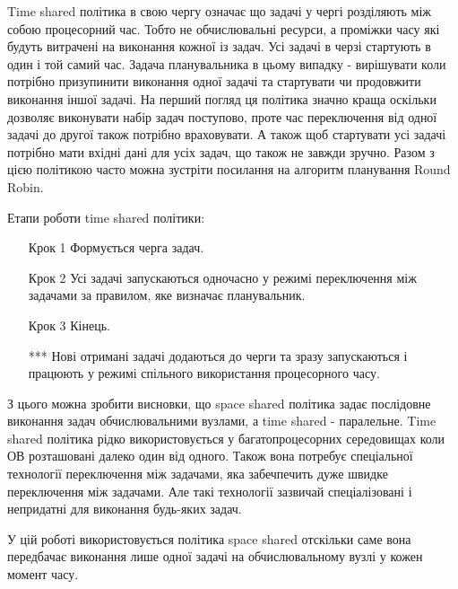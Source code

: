 Time shared політика в свою чергу означає що задачі у чергі розділяють між собою процесорний час. Тобто не обчислювальні ресурси, а проміжки часу які будуть витрачені на виконання кожної із задач. Усі задачі в черзі стартують в один і той самий час. Задача планувальника в цьому випадку - вирішувати коли потрібно призупинити виконання одної задачі та стартувати чи продовжити виконання іншої задачі. На перший погляд ця політика значно краща оскільки дозволяє виконувати набір задач поступово, проте час переключення від одної задачі до другої також потрібно враховувати. А також щоб стартувати усі задачі потрібно мати вхідні дані для усіх задач, що також не завжди зручно. Разом з цією політикою часто можна зустріти посилання на алгоритм планування Round Robin.

Етапи роботи time shared політики:
\begin{itemize}
	\item[Крок 1] Формується черга задач.
	\item[Крок 2] Усі задачі запускаються одночасно у режимі переключення між задачами за правилом, яке визначає планувальник.
	\item[Крок 3] Кінець.
	\item[***] Нові отримані задачі додаються до черги та зразу запускаються і працюють у режимі спільного використання процесорного часу.
\end{itemize}

З цього можна зробити висновки, що space shared політика задає послідовне виконання задач обчислювальними вузлами, а time shared - паралельне. Time shared політика рідко використовується у багатопроцесорних середовищах коли ОВ розташовані далеко один від одного. Також вона потребує спеціальної технології переключення між задачами, яка забечпечить дуже швидке переключення між задачами. Але такі технології зазвичай спеціалізовані і непридатні для виконання будь-яких задач.

У цій роботі використовується політика space shared отскільки саме вона передбачає виконання лише одної задачі на обчислювальному вузлі у кожен момент часу.

